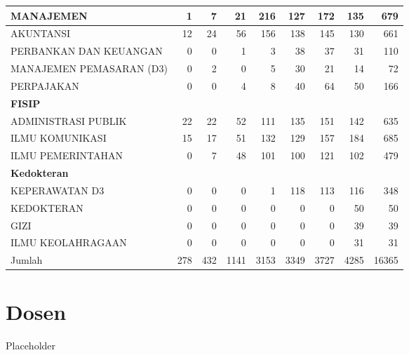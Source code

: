 \documentclass[
]{book}
\begin{document}
\begin{table}[H]
\begin{tabular}{l|r|r|r|r|r|r|r|r}
\hspace{1em}MANAJEMEN & 1 & 7 & 21 & 216 & 127 & 172 & 135 & 679\\
\hline
\hspace{1em}AKUNTANSI & 12 & 24 & 56 & 156 & 138 & 145 & 130 & 661\\
\hline
\hspace{1em}PERBANKAN DAN KEUANGAN & 0 & 0 & 1 & 3 & 38 & 37 & 31 & 110\\
\hline
\hspace{1em}MANAJEMEN PEMASARAN (D3) & 0 & 2 & 0 & 5 & 30 & 21 & 14 & 72\\
\hline
\hspace{1em}PERPAJAKAN & 0 & 0 & 4 & 8 & 40 & 64 & 50 & 166\\
\hline
\multicolumn{9}{l}{\textbf{FISIP}}\\
\hline
\hspace{1em}ADMINISTRASI PUBLIK & 22 & 22 & 52 & 111 & 135 & 151 & 142 & 635\\
\hline
\hspace{1em}ILMU KOMUNIKASI & 15 & 17 & 51 & 132 & 129 & 157 & 184 & 685\\
\hline
\hspace{1em}ILMU PEMERINTAHAN & 0 & 7 & 48 & 101 & 100 & 121 & 102 & 479\\
\hline
\multicolumn{9}{l}{\textbf{Kedokteran}}\\
\hline
\hspace{1em}KEPERAWATAN D3 & 0 & 0 & 0 & 1 & 118 & 113 & 116 & 348\\
\hline
\hspace{1em}KEDOKTERAN & 0 & 0 & 0 & 0 & 0 & 0 & 50 & 50\\
\hline
\hspace{1em}GIZI & 0 & 0 & 0 & 0 & 0 & 0 & 39 & 39\\
\hline
\hspace{1em}ILMU KEOLAHRAGAAN & 0 & 0 & 0 & 0 & 0 & 0 & 31 & 31\\
\hline
Jumlah & 278 & 432 & 1141 & 3153 & 3349 & 3727 & 4285 & 16365\\
\hline
\end{tabular}
\end{table}

\hypertarget{dosen}{%
\chapter{Dosen}\label{dosen}}

Placeholder
\end{document}
